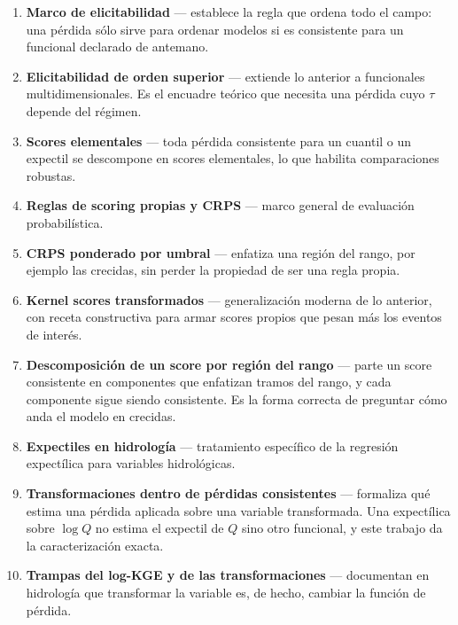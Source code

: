 \documentclass{../comun/tesisuba}
\newcommand{\entrada}[2]{\item \textbf{#1} --- #2}
\begin{document}
\begin{enumerate}[leftmargin=*, itemsep=3pt]
\entrada{Marco de elicitabilidad}{establece la regla que ordena todo el campo: una pérdida sólo
sirve para ordenar modelos si es consistente para un funcional declarado de antemano.
\citet{gneiting-2011-making-evaluating-point-forecasts}}

\entrada{Elicitabilidad de orden superior}{extiende lo anterior a funcionales multidimensionales.
Es el encuadre teórico que necesita una pérdida cuyo $\tau$ depende del régimen.
\citet{fissler-ziegel-2016-higher-order-elicitability}}

\entrada{Scores elementales}{toda pérdida consistente para un cuantil o un expectil se descompone
en scores elementales, lo que habilita comparaciones robustas.
\citet{ehm-2016-quantiles-expectiles}}

\entrada{Reglas de scoring propias y CRPS}{marco general de evaluación probabilística.
\citet{gneiting-raftery-2007-scoring-rules}}

\entrada{CRPS ponderado por umbral}{enfatiza una región del rango, por ejemplo las crecidas, sin
perder la propiedad de ser una regla propia. \citet{gneiting-ranjan-2011-weighted-scoring}}

\entrada{Kernel scores transformados}{generalización moderna de lo anterior, con receta
constructiva para armar scores propios que pesan más los eventos de interés.
\citet{allen-2023-transformed-kernel-scores}}

\entrada{Descomposición de un score por región del rango}{parte un score consistente en
componentes que enfatizan tramos del rango, y cada componente sigue siendo consistente. Es la
forma correcta de preguntar cómo anda el modelo en crecidas.
\citet{taggart-2022-extreme-events-scoring}}

\entrada{Expectiles en hidrología}{tratamiento específico de la regresión expectílica para
variables hidrológicas. \citet{tyralis-2023-expectile-hydrological}}

\entrada{Transformaciones dentro de pérdidas consistentes}{formaliza qué estima una pérdida
aplicada sobre una variable transformada. Una expectílica sobre $\log Q$ no estima el expectil de
$Q$ sino otro funcional, y este trabajo da la caracterización exacta.
\citet{tyralis-2026-variable-transformations-loss}}

\entrada{Trampas del log-KGE y de las transformaciones}{documentan en hidrología que transformar
la variable es, de hecho, cambiar la función de pérdida.
\citet{santos-2018-log-kge-pitfalls, thirel-2024-streamflow-transformations}}


\end{enumerate}
\end{document}
